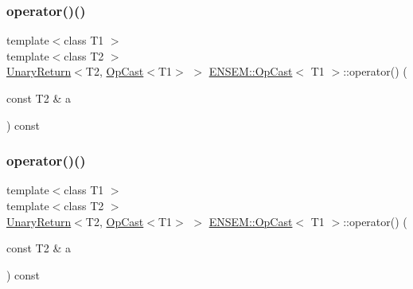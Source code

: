 \subsubsection{\texorpdfstring{operator()()}{operator()()}\hspace{0.1cm}{\footnotesize\ttfamily [1/3]}}
{\footnotesize\ttfamily template$<$class T1 $>$ \\
template$<$class T2 $>$ \\
\mbox{\hyperlink{structENSEM_1_1UnaryReturn}{Unary\+Return}}$<$T2, \mbox{\hyperlink{structENSEM_1_1OpCast}{Op\+Cast}}$<$T1$>$ $>$ \mbox{\hyperlink{structENSEM_1_1OpCast}{E\+N\+S\+E\+M\+::\+Op\+Cast}}$<$ T1 $>$\+::operator() (\begin{DoxyParamCaption}\item[{const T2 \&}]{a }\end{DoxyParamCaption}) const\hspace{0.3cm}{\ttfamily [inline]}}

\mbox{\label{structENSEM_1_1OpCast_a330c92c529ef7bba55e2b3cbbbf0c81a}} 
\subsubsection{\texorpdfstring{operator()()}{operator()()}\hspace{0.1cm}{\footnotesize\ttfamily [2/3]}}
{\footnotesize\ttfamily template$<$class T1 $>$ \\
template$<$class T2 $>$ \\
\mbox{\hyperlink{structENSEM_1_1UnaryReturn}{Unary\+Return}}$<$T2, \mbox{\hyperlink{structENSEM_1_1OpCast}{Op\+Cast}}$<$T1$>$ $>$ \mbox{\hyperlink{structENSEM_1_1OpCast}{E\+N\+S\+E\+M\+::\+Op\+Cast}}$<$ T1 $>$\+::operator() (\begin{DoxyParamCaption}\item[{const T2 \&}]{a }\end{DoxyParamCaption}) const\hspace{0.3cm}{\ttfamily [inline]}}

\mbox{\label{structENSEM_1_1OpCast_a330c92c529ef7bba55e2b3cbbbf0c81a}} 
